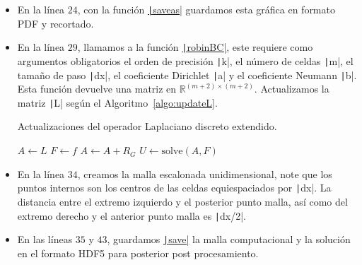 \begin{problem}
\begin{itemize}
  \item

        En la línea $24$, con la función
        \href{https://docs.octave.org/latest/Printing-and-Saving-Plots.html}{\texttt|saveas|}
        guardamos esta gráfica en formato PDF y recortado.

  \item

        En la línea $29$, llamamos a la función
        \href{https://carlosal1015.github.io/mole_examples/api_docs/matlab/src/matlab/robinBC.html}{\texttt|robinBC|},
        este requiere como argumentos obligatorios el orden de
        precisión \texttt|k|, el número  de celdas
        \texttt|m|, el tamaño de paso
        \texttt|dx|, el coeficiente Dirichlet
        \texttt|a| y el coeficiente Neumann
        \texttt|b|.
        Esta función devuelve una matriz en
        \begin{math}
          \mathbb{R}^{\left(m+2\right)\times\left(m+2\right)}
        \end{math}.
        Actualizamos la matriz \texttt|L| según el
        Algoritmo~\ref{algo:updateL}.

        \begin{algorithm}[H]
          \caption{Actualizaciones del operador Laplaciano discreto extendido.}\label{algo:updateL}
          $A\leftarrow L$\;
          $F\leftarrow f$\;
          $A\leftarrow A+R_{G}$\;
          $U\leftarrow \text{solve}\left(A, F\right)$\;
        \end{algorithm}

  \item

        En la línea $34$, creamos la malla escalonada
        unidimensional, note que los puntos internos son los
        centros de las celdas equiespaciados por
        \texttt|dx|.
        La distancia entre el extremo izquierdo y el posterior
        punto malla, así como del extremo derecho y el anterior
        punto malla es \texttt|dx/2|.

  \item

        En las líneas $35$ y $43$, guardamos
        \href{https://docs.octave.org/latest/Simple-File-I_002fO.html#index-save-6}{\texttt|save|}
        la malla computacional y la solución en el formato HDF5
        para posterior post procesamiento.


\end{itemize}
\end{problem}
